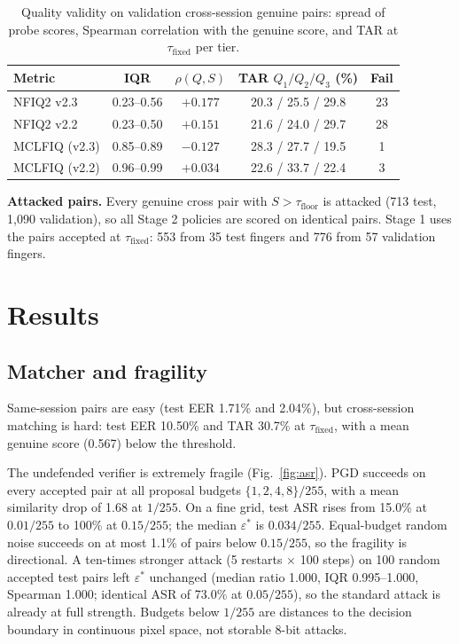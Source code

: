 \documentclass[10pt,twocolumn,letterpaper]{article}
\newcommand{\eps}{\varepsilon}
\newcommand{\taufix}{\tau_{\mathrm{fixed}}}
\newcommand{\taufloor}{\tau_{\mathrm{floor}}}
\begin{document}
\begin{table}[t]
\centering\footnotesize\setlength{\tabcolsep}{3pt}
\caption{Quality validity on validation cross-session genuine pairs: spread of probe scores, Spearman correlation with the genuine score, and TAR at $\taufix$ per tier.}
\label{tab:quality}
\begin{tabular}{lcccc}
\toprule
Metric & IQR & $\rho(Q,S)$ & TAR $Q_1/Q_2/Q_3$ (\%) & Fail \\
\midrule
NFIQ2 v2.3 & 0.23--0.56 & $+0.177$ & 20.3 / 25.5 / 29.8 & 23 \\
NFIQ2 v2.2 & 0.23--0.50 & $+0.151$ & 21.6 / 24.0 / 29.7 & 28 \\
MCLFIQ (v2.3) & 0.85--0.89 & $-0.127$ & 28.3 / 27.7 / 19.5 & 1 \\
MCLFIQ (v2.2) & 0.96--0.99 & $+0.034$ & 22.6 / 33.7 / 22.4 & 3 \\
\bottomrule
\end{tabular}
\end{table}

\textbf{Attacked pairs.} Every genuine cross pair with $S > \taufloor$ is attacked (713 test, 1{,}090 validation), so all Stage 2 policies are scored on identical pairs. Stage 1 uses the pairs accepted at $\taufix$: 553 from 35 test fingers and 776 from 57 validation fingers.

\section{Results}
\subsection{Matcher and fragility}
Same-session pairs are easy (test EER 1.71\% and 2.04\%), but cross-session matching is hard: test EER 10.50\% and TAR 30.7\% at $\taufix$, with a mean genuine score (0.567) below the threshold.

The undefended verifier is extremely fragile (Fig.~\ref{fig:asr}). PGD succeeds on every accepted pair at all proposal budgets $\{1,2,4,8\}/255$, with a mean similarity drop of 1.68 at $1/255$. On a fine grid, test ASR rises from 15.0\% at $0.01/255$ to 100\% at $0.15/255$; the median $\eps^*$ is $0.034/255$. Equal-budget random noise succeeds on at most 1.1\% of pairs below $0.15/255$, so the fragility is directional. A ten-times stronger attack (5 restarts $\times$ 100 steps) on 100 random accepted test pairs left $\eps^*$ unchanged (median ratio 1.000, IQR 0.995--1.000, Spearman 1.000; identical ASR of 73.0\% at $0.05/255$), so the standard attack is already at full strength. Budgets below $1/255$ are distances to the decision boundary in continuous pixel space, not storable 8-bit attacks.
\end{document}

